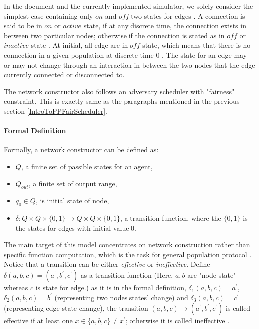 \par\noindent
In the document and the currently implemented simulator, we solely consider the simplest
case containing only $on$ and $off$ two states for edges  \cite{MS16a}. A connection is said to be in
$on$ or $active$ state, if at any discrete time, the connection exists in between two
particular nodes; otherwise if the connection is stated as in $off$ or $inactive$ state  \cite{MS16a}.
At initial, all edge are in $off$ state, which means that there is no connection in a given
population at discrete time 0  \cite{MS16a}. The state for an edge may or may not change through an interaction
in between the two nodes that the edge currently connected or disconnected to.


\par\noindent
The network constructor also follows an adversary scheduler with "fairness" constraint. This is
exactly same as the paragraphs mentioned in the previous section \ref{IntroToPPFairScheduler}.

\paragraph{Formal Definition \cite{MS16a}}
Formally, a network constructor can be defined as:
\begin{itemize}
  \item $Q$, a finite set of passible states for an agent,
  \item $Q_{out}$, a finite set of output range,
  \item $q_{0} \in Q $, is initial state of node,
  \item $\delta: Q \times Q \times \{0,1\} \to Q \times Q \times \{0,1\}$, a transition function, where the $\{0,1\}$ is the states for edges with initial value 0.
\end{itemize}


\par\noindent
The main target of this model concentrates on network construction rather than
specific function computation, which is the task for general population protocol \cite{MS16a}. Notice that a transition can be either \textit{effective}
or \textit{ineffective}. Define $\delta(a, b, c) = (a^{'}, b^{'},c^{'})$ as a transition function (Here, $a, b$ are "node-state" whereas $c$ is state for edge.)
as it is in the formal definition, $\delta_{1}(a,b,c) = a^{'}$, $\delta_{2}(a,b,c) = b^{'}$ (representing two nodes states' change)
and $\delta_{3}(a,b,c) = c^{'}$ (representing edge state change), the transition $(a,b,c) \to (a^{'}, b^{'},c^{'})$ is called
effective if at least one $x \in \{a,b,c\} \not= x^{'} $; otherwise it is called ineffective \cite{MS16a}.


